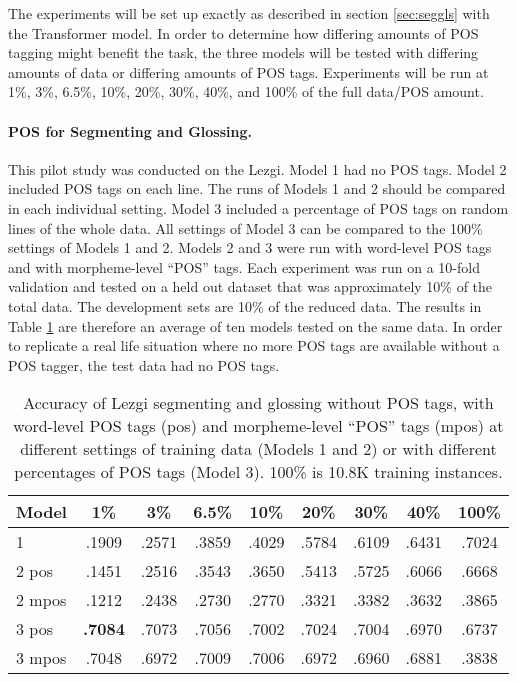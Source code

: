 The experiments will be set up exactly as described in section \ref{sec:seggls} with the Transformer model. In order to determine how differing amounts of POS tagging might benefit the task, the three models will be tested with differing amounts of data or differing amounts of POS tags. Experiments will be run at 1\%, 3\%, 6.5\%, 10\%, 20\%, 30\%, 40\%, and 100\% of the full data/POS amount. 

\paragraph{POS for Segmenting and Glossing.}
This pilot study was conducted on the Lezgi. Model 1 had no POS tags. Model 2 included POS tags on each line. The runs of Models 1 and 2 should be compared in each individual setting. Model 3 included a percentage of POS tags on random lines of the whole data. All settings of Model 3 can be compared to the 100\% settings of Models 1 and 2. Models 2 and 3 were run with word-level POS tags and with morpheme-level ``POS'' tags. Each experiment was run on a 10-fold validation and tested on a held out dataset that was approximately 10\% of the total data. The development sets are 10\% of the reduced data. The results in Table \ref{tab:POSSG} are therefore an average of ten models tested on the same data. In order to replicate a real life situation where no more POS tags are available without a POS tagger, the test data had no POS tags. 

\begin{table}[]
    \centering
    \begin{tabular}{l|cccccccc}
       \textbf{Model} & \textbf{1\%} & \textbf{3\%} & \textbf{6.5\%} & \textbf{10\%} & \textbf{20\%} & \textbf{30\%} & \textbf{40\%} & \textbf{100\%} \\
      \hline
       1       & .1909 & .2571 & .3859 & .4029 & .5784 & .6109 & .6431 & .7024   \\
       \hline
       2 pos   & .1451 & .2516 & .3543 & .3650 & .5413 & .5725 & .6066 & .6668  \\
       2 mpos  & .1212 & .2438 & .2730 & .2770 & .3321 & .3382 & .3632 & .3865  \\
       \hline
       3 pos   & \textbf{.7084} & .7073 & .7056 & .7002 & .7024 & .7004 & .6970 & .6737  \\
       3 mpos  & .7048 & .6972  & .7009 & .7006 & .6972 & .6960 & .6881 & .3838  \\
    \end{tabular}
    \caption[Segmenting and Glossing with/out POS tags]{Accuracy of Lezgi segmenting and glossing without POS tags, with word-level POS tags (pos) and morpheme-level ``POS'' tags (mpos)  at different settings of training data (Models 1 and 2) or with different percentages of POS tags (Model 3). 100\% is 10.8K training instances.}
    \label{tab:POSSG}
\end{table}

